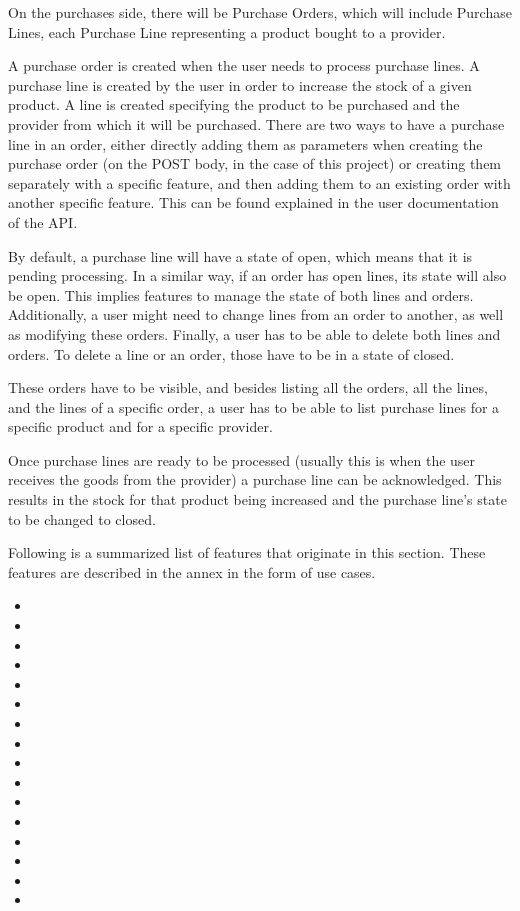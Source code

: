 On the purchases side, there will be Purchase Orders, which will include Purchase Lines, each Purchase Line representing a product bought to a provider.

A purchase order is created when the user needs to process purchase lines. A purchase line is created by the user in order to increase the stock of a given product. A line is created specifying the product to be purchased and the provider from which it will be purchased. There are two ways to have a purchase line in an order, either directly adding them as parameters when creating the purchase order (on the POST body, in the case of this project) or creating them separately with a specific feature, and then adding them to an existing order with another specific feature. This can be found explained in the user documentation of the API.

By default, a purchase line will have a state of open, which means that it is pending processing. In a similar way, if an order has open lines, its state will also be open. This implies features to manage the state of both lines and orders. Additionally, a user might need to change lines from an order to another, as well as modifying these orders. Finally, a user has to be able to delete both lines and orders. To delete a line or an order, those have to be in a state of closed.

These orders have to be visible, and besides listing all the orders, all the lines, and the lines of a specific order, a user has to be able to list purchase lines for a specific product and for a specific provider.

Once purchase lines are ready to be processed (usually this is when the user receives the goods from the provider) a purchase line can be acknowledged. This results in the stock for that product being increased and the purchase line’s state to be changed to closed.

Following is a summarized list of features that originate in this section. These features are described in the annex in the form of use cases.

\begin{itemize}
\item {}
\item {}
\item {}
\item {}
\item {}
\item {}
\item {}
\item {}
\item {}
\item {}
\item {}
\item {}
\item {}
\item {}
\item {}
\item {}
\end{itemize}

